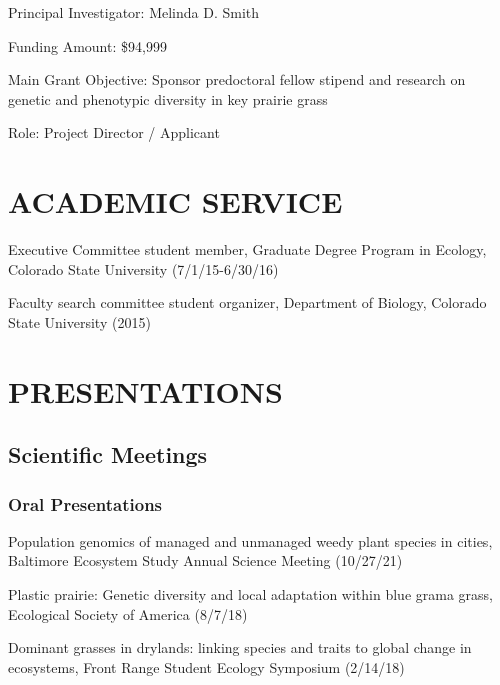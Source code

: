 \documentclass{cv}
\begin{document}
Principal Investigator: Melinda D. Smith

Funding Amount: \$94,999

Main Grant Objective: Sponsor predoctoral fellow stipend and research on genetic and phenotypic diversity in key prairie grass

Role: Project Director / Applicant



\section*{ACADEMIC SERVICE}

Executive Committee student member, Graduate Degree Program in Ecology, Colorado State University (7/1/15-6/30/16)

Faculty search committee student organizer, Department of Biology, Colorado State University (2015)


\section*{PRESENTATIONS}

\subsection*{Scientific Meetings}

\subsubsection*{Oral Presentations}

Population genomics of managed and unmanaged weedy plant species in cities, Baltimore Ecosystem Study Annual Science Meeting (10/27/21)

Plastic prairie: Genetic diversity and local adaptation within blue grama grass, Ecological Society of America (8/7/18)

Dominant grasses in drylands: linking species and traits to global change in ecosystems, Front Range Student Ecology Symposium (2/14/18)
\end{document}
